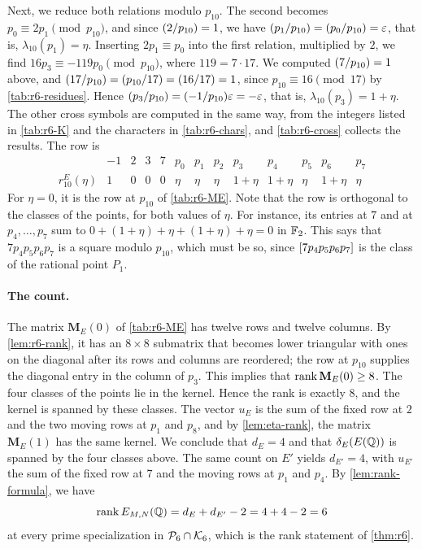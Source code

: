 Next, we reduce both relations modulo $p_{10}$. The second becomes $p_0\equiv2p_1\pmod{p_{10}}$, and since $\leg2{p_{10}}=1$, we have $\leg{p_1}{p_{10}}=\leg{p_0}{p_{10}}=\eps$, that is, $\lambda_{10}(p_1)=\eta$. Inserting $2p_1\equiv p_0$ into the first relation, multiplied by $2$, we find $16p_3\equiv-119p_0\pmod{p_{10}}$, where $119=7\cdot17$. We computed $\leg7{p_{10}}=1$ above, and $\leg{17}{p_{10}}=\leg{p_{10}}{17}=\leg{16}{17}=1$, since $p_{10}\equiv16\pmod{17}$ by \cref{tab:r6-residues}. Hence $\leg{p_3}{p_{10}}=\leg{-1}{p_{10}}\eps=-\eps$, that is, $\lambda_{10}(p_3)=1+\eta$. The other cross symbols are computed in the same way, from the integers listed in \cref{tab:r6-K} and the characters in \cref{tab:r6-chars}, and \cref{tab:r6-cross} collects the results. The row is
\begin{equation*}
\begin{array}{c|cccc|cccccccc}
 & -1 & 2 & 3 & 7 & p_0 & p_1 & p_2 & p_3 & p_4 & p_5 & p_6 & p_7\\
\hline
r^E_{10}(\eta) & 1 & 0 & 0 & 0 & \eta & \eta & \eta & 1+\eta & 1+\eta & \eta & 1+\eta & \eta
\end{array}
\end{equation*}
For $\eta=0$, it is the row at $p_{10}$ of \cref{tab:r6-ME}. Note that the row is orthogonal to the classes of the points, for both values of $\eta$. For instance, its entries at $7$ and at $p_4,\dots,p_7$ sum to $0+(1+\eta)+\eta+(1+\eta)+\eta=0$ in $\mathbb F_2$. This says that $7p_4p_5p_6p_7$ is a square modulo $p_{10}$, which must be so, since $[7p_4p_5p_6p_7]$ is the class of the rational point $P_1$.

\paragraph{The count.} The matrix $\mathbf M_E(0)$ of \cref{tab:r6-ME} has twelve rows and twelve columns. By \cref{lem:r6-rank}, it has an $8\times8$ submatrix that becomes lower triangular with ones on the diagonal after its rows and columns are reordered; the row at $p_{10}$ supplies the diagonal entry in the column of $p_3$. This implies that $\operatorname{rank}\mathbf M_E(0)\ge8$. The four classes of the points lie in the kernel. Hence the rank is exactly $8$, and the kernel is spanned by these classes. The vector $u_E$ is the sum of the fixed row at $2$ and the two moving rows at $p_1$ and $p_8$, and by \cref{lem:eta-rank}, the matrix $\mathbf M_E(1)$ has the same kernel. We conclude that $d_E=4$ and that $\delta_E(E(\mathbb Q))$ is spanned by the four classes above. The same count on $E'$ yields $d_{E'}=4$, with $u_{E'}$ the sum of the fixed row at $7$ and the moving rows at $p_1$ and $p_4$. By \cref{lem:rank-formula}, we have
\begin{equation*}
\operatorname{rank} E_{M,N}(\mathbb Q)=d_E+d_{E'}-2=4+4-2=6
\end{equation*}
at every prime specialization in $\mathcal P_6\cap\mathcal K_6$, which is the rank statement of \cref{thm:r6}.


